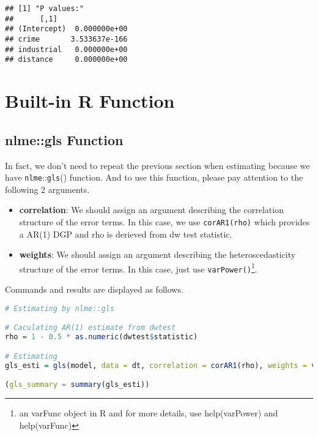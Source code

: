 \documentclass{article}
\theoremstyle{definition}
\providecommand{\tightlist}{%
	\setlength{\itemsep}{0pt}\setlength{\parskip}{0pt}}
\begin{document}
\begin{Verbatim}
## [1] "P values:"
##	  	[,1]
## (Intercept)  0.000000e+00
## crime       3.533637e-166
## industrial   0.000000e+00
## distance     0.000000e+00
\end{Verbatim}



\section{Built-in R Function}

\subsection{nlme::gls Function}
In fact, we don't need to repeat the previous section when estimating because we have \texttt{nlme}::\texttt{gls}() function. And to use this function, please pay attention to the following 2 arguments.\\

\begin{itemize}
\tightlist
\item
\textbf{correlation}: We should assign an argument describing the correlation structure of the error terms. In this case, we use \texttt{corAR1(rho)} which provides a AR(1) DGP and rho is derieved from dw test statistic.
\item
\textbf{weights}: We should assign an argument describing the heteroscedasticity structure of the error terms. In this case, just use \texttt{varPower()}\footnote{an varFunc object in R and for more details, use help(varPower) and help(varFunc) }.
\end{itemize}

Commands and results are displayed as follows.\\

\begin{lstlisting}[language = R]
# Estimating by nlme::gls 

# Caculating AR(1) estimate from dwtest
rho = 1 - 0.5 * as.numeric(dwtest$statistic)

# Estimating
gls_esti = gls(model, data = dt, correlation = corAR1(rho), weights = varPower())

(gls_summary = summary(gls_esti))
\end{lstlisting}
\end{document}
